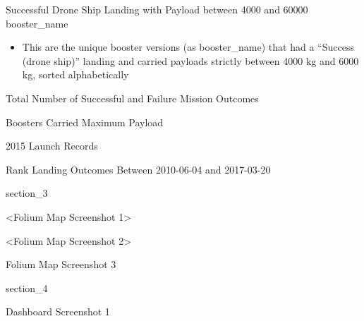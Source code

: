 \begin{frame}{Successful Drone Ship Landing with Payload between 4000 and 60000}
    {booster_name}
    \begin{itemize}
        \item This are the unique booster versions (as booster\_name) that had a ``Success (drone ship)'' landing and carried payloads strictly between 4000 kg and 6000 kg, sorted alphabetically
    \end{itemize}
\end{frame}

\begin{frame}{Total Number of Successful and Failure Mission Outcomes}

\end{frame}

\begin{frame}{Boosters Carried Maximum Payload}

\end{frame}

\begin{frame}{2015 Launch Records}

\end{frame}

\begin{frame}{Rank Landing Outcomes Between 2010-06-04 and 2017-03-20}

\end{frame}

{
{section_3}
\begin{frame}[plain]
\end{frame}
}

\begin{frame}{<Folium Map Screenshot 1>}

\end{frame}

\begin{frame}{<Folium Map Screenshot 2>}

\end{frame}

\begin{frame}{Folium Map Screenshot 3}

\end{frame}

{
{section_4}
\begin{frame}[plain]
\end{frame}
}

\begin{frame}{Dashboard Screenshot 1}

\end{frame}

